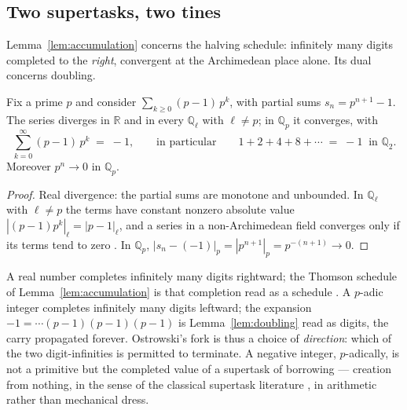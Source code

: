 \subsection{Two supertasks, two tines}
\label{app:padic-supertasks}

Lemma~\ref{lem:accumulation} concerns the halving schedule: infinitely many digits
completed to the \emph{right}, convergent at the Archimedean place alone. Its dual
concerns doubling.

\begin{lemma}\label{lem:doubling}
Fix a prime $p$ and consider $\sum_{k \ge 0} (p-1)\,p^{k}$, with partial sums
$s_n = p^{n+1} - 1$. The series diverges in $\mathbb{R}$ and in every
$\mathbb{Q}_{\ell}$ with $\ell \ne p$; in $\mathbb{Q}_p$ it converges, with
\begin{equation}
\sum_{k=0}^{\infty} (p-1)\,p^{k} \;=\; -1,
\qquad\text{in particular}\qquad
1 + 2 + 4 + 8 + \cdots \;=\; -1 \ \text{ in } \mathbb{Q}_2.
\label{eq:fanout-tally}
\end{equation}
Moreover $p^{n} \to 0$ in $\mathbb{Q}_p$.
\end{lemma}

\begin{proof}
Real divergence: the partial sums are monotone and unbounded. In $\mathbb{Q}_{\ell}$
with $\ell \ne p$ the terms have constant nonzero absolute value
$|(p-1)p^{k}|_{\ell} = |p-1|_{\ell}$, and a series in a non-Archimedean field converges
only if its terms tend to zero \autocite{gouvea1997}. In $\mathbb{Q}_p$,
$|s_n - (-1)|_p = |p^{n+1}|_p = p^{-(n+1)} \to 0$.
\end{proof}

\begin{remark}\label{rem:digits}
A real number completes infinitely many digits rightward; the Thomson schedule of
Lemma~\ref{lem:accumulation} is that completion read as a schedule
\autocite{thomson1954}. A $p$-adic integer completes infinitely many digits leftward;
the expansion $-1 = \cdots(p-1)(p-1)(p-1)$ is Lemma~\ref{lem:doubling} read as digits,
the carry propagated forever. Ostrowski's fork is thus a choice of \emph{direction}:
which of the two digit-infinities is permitted to terminate. A negative integer,
$p$-adically, is not a primitive but the completed value of a supertask of borrowing
--- creation from nothing, in the sense of the classical supertask literature
\autocite{laraudogoitia1998}, in arithmetic rather than mechanical dress.
\end{remark}

